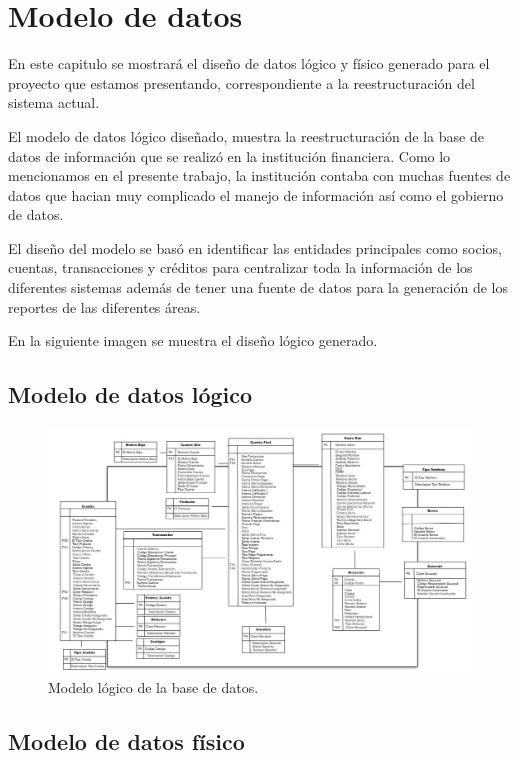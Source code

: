 \chapter{Modelo de datos}
\label{cap:modelo}
En este capitulo se mostrará el diseño de datos lógico y físico generado para el proyecto que estamos presentando, correspondiente a la reestructuración del sistema actual. 

El modelo de datos lógico diseñado, muestra la reestructuración de la base de datos de información que se realizó en la institución financiera. 
Como lo mencionamos en el presente trabajo, la institución contaba con muchas fuentes de datos que hacian muy complicado el manejo de información
así como el gobierno de datos. 

El diseño del modelo se basó en identificar las entidades principales como socios, cuentas, transacciones y créditos para centralizar 
toda la información de los diferentes sistemas además de tener una fuente de datos para la generación de los reportes de las diferentes áreas.

En la siguiente imagen se muestra el diseño lógico generado.

\section{Modelo de datos lógico}
\begin{figure}[htb]
  \begin{center}
    \includegraphics[width=\linewidth]{Modelo_logico.jpg}
        \caption{Modelo lógico de la base de datos.}
    \label{fig:modelo-logico}
  \end{center}
\end{figure}


\section{Modelo de datos físico}

